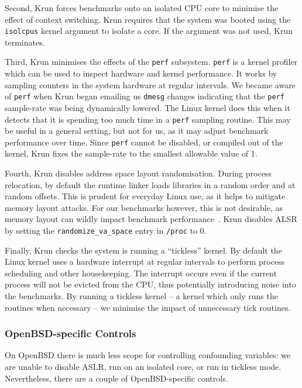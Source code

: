 \documentclass[10pt,preprint]{sigplanconf}
\newcommand{\krun}{Krun\xspace}
\begin{document}
Second, \krun forces benchmarks onto an isolated CPU core to minimise the
effect of context switching. \krun requires that the system was booted using
the \texttt{isolcpus} kernel argument to isolate a core. If the argument was
not used, \krun terminates.

Third, \krun minimises the effects of the \texttt{perf} subsystem.
\texttt{perf} is a kernel profiler which can be used to inspect hardware and
kernel performance. It works by sampling counters in the system hardware at
regular intervals. We became aware of \texttt{perf} when \krun began emailing
us \texttt{dmesg} changes indicating that the \texttt{perf} sample-rate was
being dynamically lowered. The Linux kernel does this when it detects that it
is spending too much time in a \texttt{perf} sampling routine. This may
be useful in a general setting, but not for us, as it may adjust benchmark
performance over time. Since \texttt{perf} cannot be disabled, or compiled out
of the kernel, \krun fixes the sample-rate to the smallest allowable value of
1.

Fourth, \krun disables address space layout randomisation. During process
relocation, by default the runtime linker loads libraries in a random order and
at random offsets. This is prudent for everyday Linux use, as it helps to
mitigate memory layout attacks. For our benchmarks however, this is not
desirable, as memory layout can wildly impact benchmark
performance~\cite{xxx}. \krun disables
ALSR by setting the \texttt{randomize\_va\_space} entry in \texttt{/proc} to 0.

Finally, \krun checks the system is running a ``tickless'' kernel. By default
the Linux kernel uses a hardware interrupt at regular intervals to perform
process scheduling and other housekeeping. The interrupt occurs even if the
current process will not be evicted from the CPU, thus potentially introducing
noise into the benchmarks. By running a tickless kernel -- a kernel which only
runs the routines when necessary -- we minimise the impact of unnecessary tick
routines.

\subsubsection{OpenBSD-specific Controls}

On OpenBSD there is much less scope for controlling confounding variables: we
are unable to disable ASLR, run on an isolated core, or run in tickless mode.
Nevertheless, there are a couple of OpenBSD-specific controls.
\end{document}
